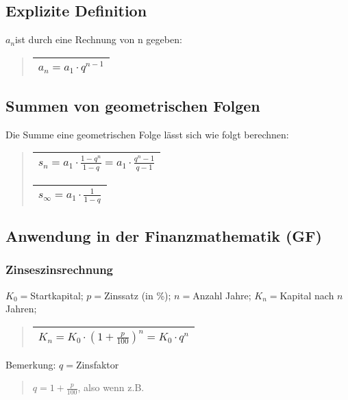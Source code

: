 \subsection*{Explizite Definition}

$a_{n}$ist durch eine Rechnung von n gegeben:
\begin{quote}
\begin{tabular}{|c|}
\hline 
$a_{n}=a_{1}\cdot q^{n-1}$\tabularnewline
\hline 
\end{tabular}
\end{quote}

\subsection*{Summen von geometrischen Folgen}

Die Summe eine geometrischen Folge lässt sich wie folgt berechnen:
\begin{verse}
\begin{tabular}{|c|}
\hline 
$s_{n}=a_{1}\cdot\frac{1-q^{n}}{1-q}=a_{1}\cdot\frac{q^{n}-1}{q-1}$\tabularnewline
\hline 
\end{tabular}

\begin{tabular}{|c|}
\hline 
$s_{\infty}=a_{1}\cdot\frac{1}{1-q}$\tabularnewline
\hline 
\end{tabular}
\end{verse}

\subsection*{Anwendung in der Finanzmathematik (GF)}


\subsubsection*{Zinseszinsrechnung}

$K_{0}=$Startkapital; $p=$Zinssatz (in \%); $n=$Anzahl Jahre; $K_{n}=$Kapital
nach $n$ Jahren;
\begin{verse}
\begin{tabular}{|c|}
\hline 
$K_{n}=K_{0}\cdot(1+\frac{p}{100})^{n}=K_{0}\cdot q^{n}$\tabularnewline
\hline 
\end{tabular}
\end{verse}
Bemerkung: $q=$Zinsfaktor
\begin{verse}
$q=1+\frac{p}{100}$, also wenn z.B. 
\end{verse}


